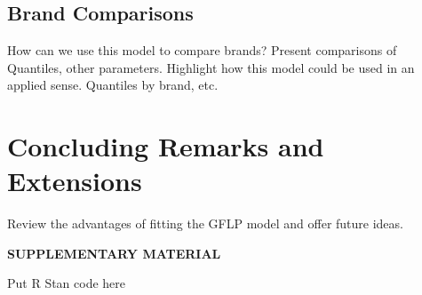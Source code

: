 \documentclass[12pt]{article}
\begin{document}
\subsection{Brand Comparisons}
How can we use this model to compare brands?  Present comparisons of Quantiles, other parameters.  Highlight how this model could be used in an applied sense. Quantiles by brand, etc.
\section{Concluding Remarks and Extensions}
Review the advantages of fitting the GFLP model and offer future ideas.  




    


\bigskip
\begin{center}
{\large\bf SUPPLEMENTARY MATERIAL}
\end{center}

\begin{description}

\item Put R Stan code here

\end{description}



\end{document}
